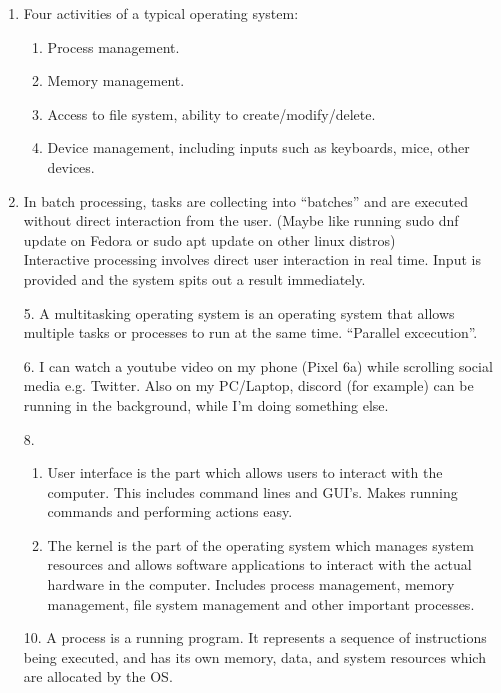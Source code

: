 \documentclass[hidelinks,12pt]{article}
\title{\scalebox{1.5}{CompSci 150 Homework 3}}
\author{\scalebox{1.5}{Theo Koss}}
\date{May 2024}
\begin{document}
\maketitle
\begin{enumerate}
    \item Four activities of a typical operating system:
        \begin{enumerate}
            \item Process management.
            \item Memory management.
            \item Access to file system, ability to create/modify/delete.
            \item Device management, including inputs such as keyboards, mice, other devices.
        \end{enumerate}
    \item In batch processing, tasks are collecting into ``batches'' and are executed without direct interaction from the user. (Maybe like running sudo dnf update on Fedora or sudo apt update on other linux distros)\\
        Interactive processing involves direct user interaction in real time. Input is provided and the system spits out a result immediately.
    \item[5.] A multitasking operating system is an operating system that allows multiple tasks or processes to run at the same time. ``Parallel excecution''. 
    \item[6.] I can watch a youtube video on my phone (Pixel 6a) while scrolling social media e.g. Twitter. Also on my PC/Laptop, discord (for example) can be running in the background, while I'm doing something else.
    \item[8.]\begin{enumerate}
            \item User interface is the part which allows users to interact with the computer. This includes command lines and GUI's. Makes running commands and performing actions easy.
            \item The kernel is the part of the operating system which manages system resources and allows software applications to interact with the actual hardware in the computer. Includes process management, memory management, file system management and other important processes.
        \end{enumerate}
    \item[10.] A process is a running program. It represents a sequence of instructions being executed, and has its own memory, data, and system resources which are allocated by the OS.

\end{enumerate}
\end{document}
